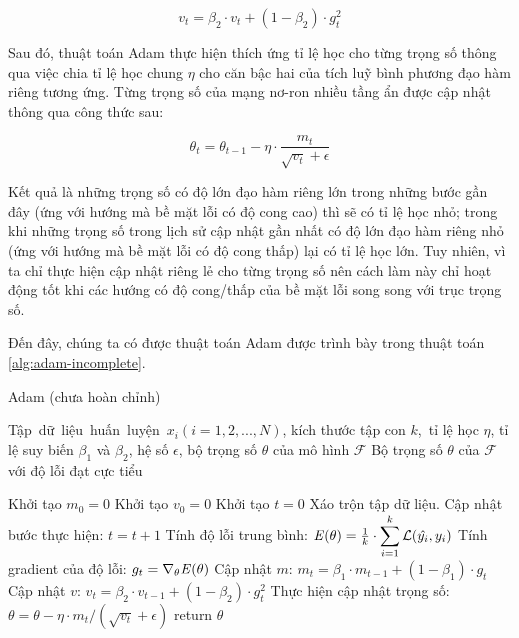 \begin{equation} \label{eqn:adam-v}
	v_t = \beta_2 \cdot v_t + (1 - \beta_2) \cdot g_t^2
\end{equation}

Sau đó, thuật toán Adam thực hiện thích ứng tỉ lệ học cho từng trọng số thông qua việc chia tỉ lệ học chung $\eta$ cho căn bậc hai của tích luỹ bình phương đạo hàm riêng tương ứng. Từng trọng số của mạng nơ-ron nhiều tầng ẩn được cập nhật thông qua công thức sau:

\begin{equation} \label{eqn:adam-step}
	\theta_t = \theta_{t-1} - \eta\cdot\frac{m_t}{\sqrt{v_t} + \epsilon}
\end{equation}

Kết quả là những trọng số có độ lớn đạo hàm riêng lớn trong những bước gần đây (ứng với hướng mà bề mặt lỗi có độ cong cao) thì sẽ có tỉ lệ học nhỏ; trong khi những trọng số trong lịch sử cập nhật gần nhất có độ lớn đạo hàm riêng nhỏ (ứng với hướng mà bề mặt lỗi có độ cong thấp) lại có tỉ lệ học lớn. Tuy nhiên, vì ta chỉ thực hiện cập nhật riêng lẻ cho từng trọng số nên cách làm này chỉ hoạt động tốt khi các hướng có độ cong/thấp của bề mặt lỗi song song với trục trọng số.

Đến đây, chúng ta có được thuật toán Adam được trình bày trong thuật toán \ref{alg:adam-incomplete}.

\begin{algorithm}[H]
	\caption{Adam (chưa hoàn chỉnh)} \label{alg:adam-incomplete}
	\begin{algorithmic}[1]
		\renewcommand{\algorithmicrequire}{\textbf{Đầu vào:}}
		\renewcommand{\algorithmicensure}{\textbf{Đầu ra:}}
		\algnewcommand{}
		\algnewcommand\Operation{\item[\algorithmicoperation]}

		\Require Tập dữ liệu huấn luyện $x_i (i = 1, 2, ..., N)$, kích thước tập con $k$, tỉ lệ học $\eta$, tỉ lệ suy biến $\beta_1$ và $\beta_2$, hệ số $\epsilon$, bộ trọng số $\theta$ của mô hình $\mathcal{F}$
		\Ensure Bộ trọng số $\theta$ của $\mathcal{F}$ với độ lỗi đạt cực tiểu

		\Operation
		\State Khởi tạo $m_0=0$
		\State Khởi tạo $v_0=0$
		\State Khởi tạo $t=0$
			\State Xáo trộn tập dữ liệu.
				\State Cập nhật bước thực hiện: $t=t+1$
				\State Tính độ lỗi trung bình: $\mathbf{\it{E}(\theta)} = \frac{1}{k}\cdot \displaystyle\sum_{i=1}^{k}\mathcal{L}(\hat{y_i}, y_i)$
				\State Tính gradient của độ lỗi: $g_t =\nabla_{\theta} \mathbf{\it{E}(\theta)}$
				\State Cập nhật $m$: $m_t = \beta_1\cdot m_{t-1} + (1-\beta_1)\cdot g_t$
				\State Cập nhật $v$: $v_t = \beta_2\cdot v_{t-1} + (1-\beta_2)\cdot g^{2}_{t}$
				\State Thực hiện cập nhật trọng số: $\theta = \theta - \eta\cdot m_t/(\sqrt{v_t} + \epsilon)$
			\EndFor
		\EndWhile
		\State return $\theta$
	\end{algorithmic}
\end{algorithm}

